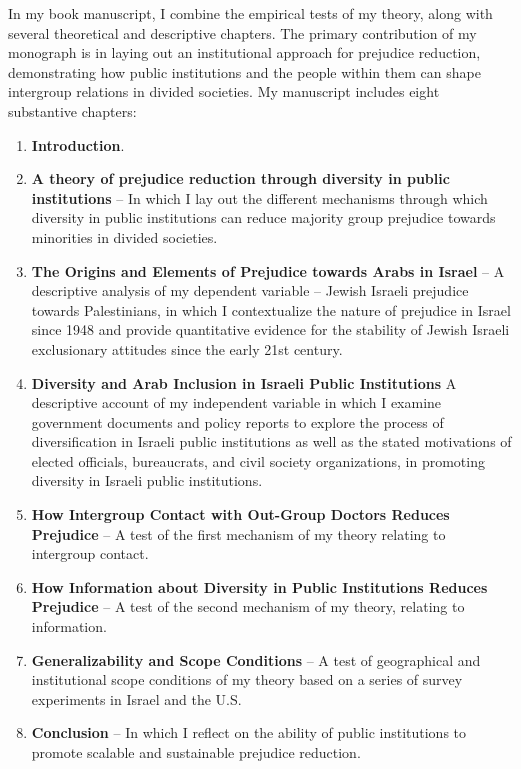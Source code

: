 \documentclass[12pt]{article}
\theoremstyle{plain}
\begin{document}
In my book manuscript, I combine the empirical tests of my theory, along with several theoretical and descriptive chapters. The primary contribution of my monograph is in laying out an institutional approach for prejudice reduction, demonstrating how public institutions and the people within them can shape intergroup relations in divided societies. My manuscript includes eight substantive chapters:

\begin{enumerate}
\item \textbf{Introduction}.
\item \textbf{A theory of prejudice reduction through diversity in public institutions} -- In which I lay out the different mechanisms through which diversity in public institutions can reduce majority group prejudice towards minorities in divided societies.
\item \textbf{The Origins and Elements of Prejudice towards Arabs in Israel} -- A descriptive analysis of my dependent variable -- Jewish Israeli prejudice towards Palestinians, in which I contextualize the nature of prejudice in Israel since 1948 and provide quantitative evidence for the stability of Jewish Israeli exclusionary attitudes since the early 21st century.
\item \textbf{Diversity and Arab Inclusion in Israeli Public Institutions} A descriptive account of my independent variable in which I examine government documents and policy reports to explore the process of diversification in Israeli public institutions as well as the stated motivations of elected officials, bureaucrats, and civil society organizations, in promoting diversity in Israeli public institutions.
\item \textbf{How Intergroup Contact with Out-Group Doctors Reduces Prejudice} -- A test of the first mechanism of my theory relating to intergroup contact.
\item \textbf{How Information about Diversity in Public Institutions Reduces Prejudice} -- A test of the second mechanism of my theory, relating to information.
\item \textbf{Generalizability and Scope Conditions} -- A test of geographical and institutional scope conditions of my theory based on a series of survey experiments in Israel and the U.S.
\item \textbf{Conclusion} -- In which I reflect on the ability of public institutions to promote scalable and sustainable prejudice reduction.
\end{enumerate}








%
%
\end{document}
